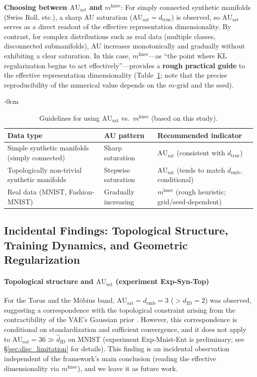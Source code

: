 \documentclass[make,article,submit,pdftex,moreauthors]{Definitions/mdpi}
\newcommand{\dID}{d_{\mathrm{ID}}}
\newcommand{\dtrue}{d_{\mathrm{true}}}
\newcommand{\AUsat}{\mathrm{AU}_{\mathrm{sat}}}
\newcommand{\mknee}{m^{\mathrm{knee}}}
\newcommand{\demb}{d_{\mathrm{emb}}}
\begin{document}
\textbf{Choosing between $\AUsat$ and $\mknee$}:
For simply connected synthetic manifolds (Swiss Roll, etc.), a sharp AU saturation
($\AUsat = \dtrue$) is observed, so $\AUsat$ serves as a direct readout of the effective
representation dimensionality.
By contrast, for complex distributions such as real data (multiple classes, disconnected
submanifolds), AU increases monotonically and gradually without exhibiting a clear
saturation.
In this case, $\mknee$---as ``the point where KL regularization begins to act
effectively''---provides a \textbf{rough practical guide} to the effective representation
dimensionality (Table~\ref{tab:au_comparison}; note that the precise reproducibility of
the numerical value depends on the $m$-grid and the seed).

\begin{table}[H]
\begin{adjustwidth}{-\extralength}{0cm}
\centering
\caption{Guidelines for using $\AUsat$ vs.\ $\mknee$ (based on this study).}
\label{tab:au_comparison}
\small
\begin{tabular}{lll}
\toprule
Data type & AU pattern & Recommended indicator \\
\midrule
Simple synthetic manifolds (simply connected) & Sharp saturation & $\AUsat$ (consistent with $\dtrue$) \\
Topologically non-trivial synthetic manifolds & Stepwise saturation & $\AUsat$ (tends to match $\demb$, conditional) \\
Real data (MNIST, Fashion-MNIST) & Gradually increasing & $\mknee$ (rough heuristic; grid/seed-dependent) \\
\bottomrule
\end{tabular}
\end{adjustwidth}
\end{table}

\subsection{Incidental Findings: Topological Structure, Training Dynamics, and Geometric Regularization}\label{sec:disc_incidental}

\paragraph{Topological structure and $\AUsat$ (experiment Exp-Syn-Top)}
For the Torus and the M\"obius band, $\AUsat = \demb = 3$ ($> \dID = 2$) was observed,
suggesting a correspondence with the topological constraint arising from the
contractibility of the VAE's Gaussian prior
\cite{hatcher2002algebraic,guillemin1974differential}.
However, this correspondence is conditional on standardization and sufficient
convergence, and it does not apply to $\AUsat = 36 \gg \hat{d}_\mathrm{ID}$ on MNIST
(experiment Exp-Mnist-Ent is preliminary; see \S\ref{sec:disc_limitation} for details).
This finding is an incidental observation independent of the framework's main
conclusion (reading the effective dimensionality via $\mknee$), and we leave it as
future work.
\end{document}
